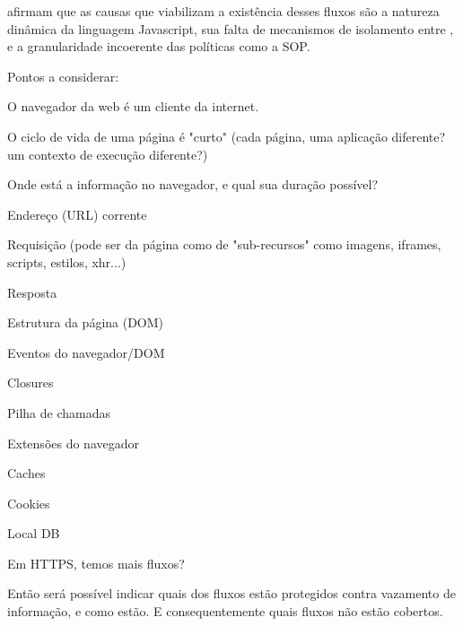 \citeauthor{Jang2010} afirmam que as causas que viabilizam a existência desses fluxos são a natureza dinâmica da linguagem Javascript, sua falta de mecanismos de isolamento entre \scripts{}, e a granularidade incoerente das políticas como a SOP.

\begin{todo}
Pontos a considerar:

\begin{alineas}
	\item O navegador da web é um cliente da internet.
	\item O ciclo de vida de uma página é "curto" (cada página, uma aplicação diferente? um contexto de execução diferente?)
	\item Onde está a informação no navegador, e qual sua duração possível?
	\begin{alineas}
		\item Endereço (URL) corrente
		\item Requisição (pode ser da página como de "sub-recursos" como imagens, iframes, scripts, estilos, xhr...)
		\item Resposta
		\item Estrutura da página (DOM)
		\item Eventos do navegador/DOM
		\item Closures
		\item Pilha de chamadas
		\item Extensões do navegador
		\item Caches
		\item Cookies
		\item Local DB
		\item Em HTTPS, temos mais fluxos?
	\end{alineas}
\end{alineas}

Então será possível indicar quais dos fluxos estão protegidos contra vazamento de informação, e como estão. E consequentemente quais fluxos não estão cobertos.
\end{todo}
